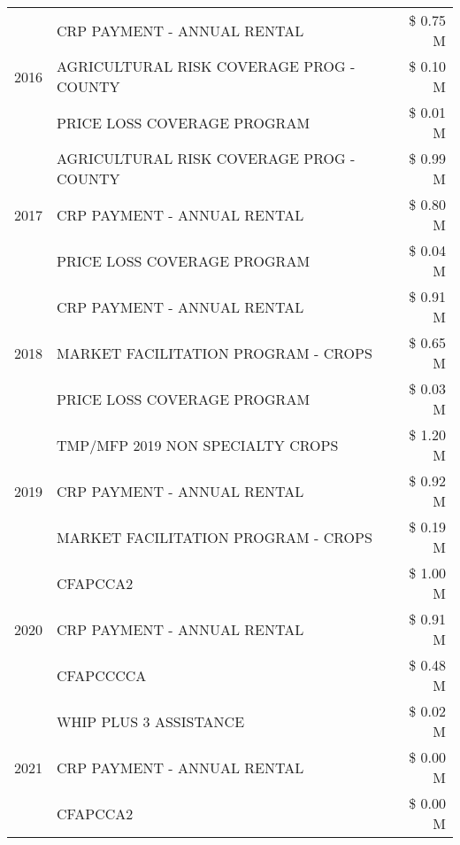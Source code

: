 \begin{tabular}{llr}
\multirow[t]{3}{*}{2016} & CRP PAYMENT - ANNUAL RENTAL & \$ 0.75 M \\
 & AGRICULTURAL RISK COVERAGE PROG - COUNTY & \$ 0.10 M \\
 & PRICE LOSS COVERAGE PROGRAM & \$ 0.01 M \\
\cline{1-3}
\multirow[t]{3}{*}{2017} & AGRICULTURAL RISK COVERAGE PROG - COUNTY & \$ 0.99 M \\
 & CRP PAYMENT - ANNUAL RENTAL & \$ 0.80 M \\
 & PRICE LOSS COVERAGE PROGRAM & \$ 0.04 M \\
\cline{1-3}
\multirow[t]{3}{*}{2018} & CRP PAYMENT - ANNUAL RENTAL & \$ 0.91 M \\
 & MARKET FACILITATION PROGRAM - CROPS & \$ 0.65 M \\
 & PRICE LOSS COVERAGE PROGRAM & \$ 0.03 M \\
\cline{1-3}
\multirow[t]{3}{*}{2019} & TMP/MFP 2019 NON SPECIALTY CROPS & \$ 1.20 M \\
 & CRP PAYMENT - ANNUAL RENTAL & \$ 0.92 M \\
 & MARKET FACILITATION PROGRAM - CROPS & \$ 0.19 M \\
\cline{1-3}
\multirow[t]{3}{*}{2020} & CFAPCCA2 & \$ 1.00 M \\
 & CRP PAYMENT - ANNUAL RENTAL & \$ 0.91 M \\
 & CFAPCCCCA & \$ 0.48 M \\
\cline{1-3}
\multirow[t]{3}{*}{2021} & WHIP PLUS 3 ASSISTANCE & \$ 0.02 M \\
 & CRP PAYMENT - ANNUAL RENTAL & \$ 0.00 M \\
 & CFAPCCA2 & \$ 0.00 M \\
\cline{1-3}
\bottomrule
\end{tabular}
